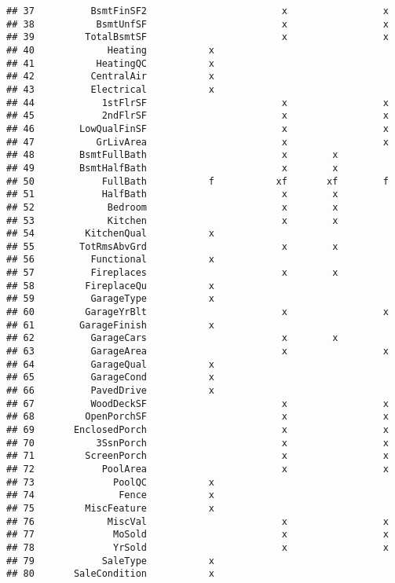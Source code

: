 \documentclass[
]{article}
\begin{document}
\begin{verbatim}
## 37          BsmtFinSF2                        x                 x
## 38           BsmtUnfSF                        x                 x
## 39         TotalBsmtSF                        x                 x
## 40             Heating           x                               
## 41           HeatingQC           x                               
## 42          CentralAir           x                               
## 43          Electrical           x                               
## 44            1stFlrSF                        x                 x
## 45            2ndFlrSF                        x                 x
## 46        LowQualFinSF                        x                 x
## 47           GrLivArea                        x                 x
## 48        BsmtFullBath                        x        x         
## 49        BsmtHalfBath                        x        x         
## 50            FullBath           f           xf       xf        f
## 51            HalfBath                        x        x         
## 52             Bedroom                        x        x         
## 53             Kitchen                        x        x         
## 54         KitchenQual           x                               
## 55        TotRmsAbvGrd                        x        x         
## 56          Functional           x                               
## 57          Fireplaces                        x        x         
## 58         FireplaceQu           x                               
## 59          GarageType           x                               
## 60         GarageYrBlt                        x                 x
## 61        GarageFinish           x                               
## 62          GarageCars                        x        x         
## 63          GarageArea                        x                 x
## 64          GarageQual           x                               
## 65          GarageCond           x                               
## 66          PavedDrive           x                               
## 67          WoodDeckSF                        x                 x
## 68         OpenPorchSF                        x                 x
## 69       EnclosedPorch                        x                 x
## 70           3SsnPorch                        x                 x
## 71         ScreenPorch                        x                 x
## 72            PoolArea                        x                 x
## 73              PoolQC           x                               
## 74               Fence           x                               
## 75         MiscFeature           x                               
## 76             MiscVal                        x                 x
## 77              MoSold                        x                 x
## 78              YrSold                        x                 x
## 79            SaleType           x                               
## 80       SaleCondition           x
\end{verbatim}
\end{document}
